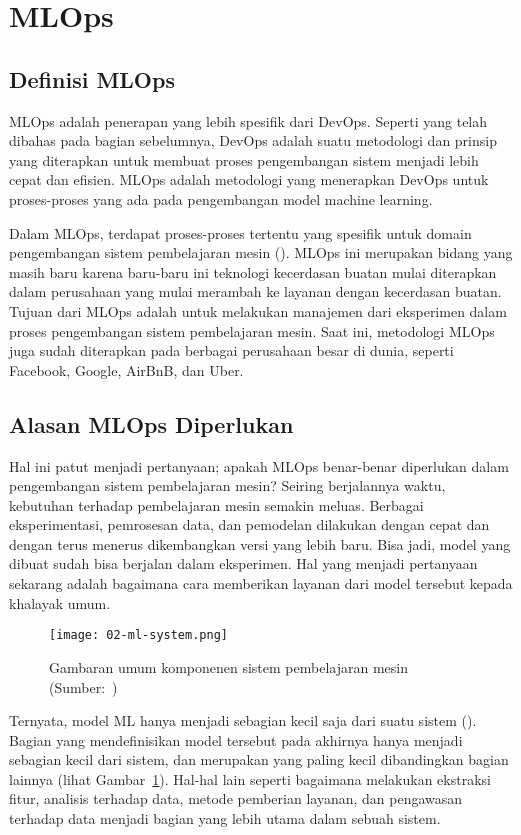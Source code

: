 \section{MLOps}

\subsection{Definisi MLOps}

MLOps adalah penerapan yang lebih spesifik dari DevOps. 
Seperti yang telah dibahas pada bagian sebelumnya, DevOps adalah suatu metodologi dan prinsip yang diterapkan untuk membuat proses pengembangan sistem menjadi lebih cepat dan efisien.
MLOps adalah metodologi yang menerapkan DevOps untuk proses-proses yang ada pada pengembangan model machine learning.

Dalam MLOps, terdapat proses-proses tertentu yang spesifik untuk domain pengembangan sistem pembelajaran mesin (\cite{mlops}).\@
MLOps ini merupakan bidang yang masih baru karena baru-baru ini teknologi kecerdasan buatan mulai diterapkan dalam perusahaan yang mulai merambah ke layanan dengan kecerdasan buatan.
Tujuan dari MLOps adalah untuk melakukan manajemen dari eksperimen dalam proses pengembangan sistem pembelajaran mesin.
Saat ini, metodologi MLOps juga sudah diterapkan pada berbagai perusahaan besar di dunia, seperti Facebook, Google, AirBnB, dan Uber.

\subsection{Alasan MLOps Diperlukan}

Hal ini patut menjadi pertanyaan; apakah MLOps benar-benar diperlukan dalam pengembangan sistem pembelajaran mesin?
Seiring berjalannya waktu, kebutuhan terhadap pembelajaran mesin semakin meluas.
Berbagai eksperimentasi, pemrosesan data, dan pemodelan dilakukan dengan cepat dan dengan terus menerus dikembangkan versi yang lebih baru.
Bisa jadi, model yang dibuat sudah bisa berjalan dalam eksperimen.
Hal yang menjadi pertanyaan sekarang adalah bagaimana cara memberikan layanan dari model tersebut kepada khalayak umum.

\begin{figure}[ht]
  \centering
  \texttt{[image: 02-ml-system.png]}
  \caption{Gambaran umum komponenen sistem pembelajaran mesin (Sumber:~\cite{NIPS2015_86df7dcf})}\label{fig:ml-system}
\end{figure}

Ternyata, model ML hanya menjadi sebagian kecil saja dari suatu sistem (\cite{NIPS2015_86df7dcf}).
Bagian yang mendefinisikan model tersebut pada akhirnya hanya menjadi sebagian kecil dari sistem, dan merupakan yang paling kecil dibandingkan bagian lainnya (lihat Gambar~\ref{fig:ml-system}).
Hal-hal lain seperti bagaimana melakukan ekstraksi fitur, analisis terhadap data, metode pemberian layanan, dan pengawasan terhadap data menjadi bagian yang lebih utama dalam sebuah sistem.

